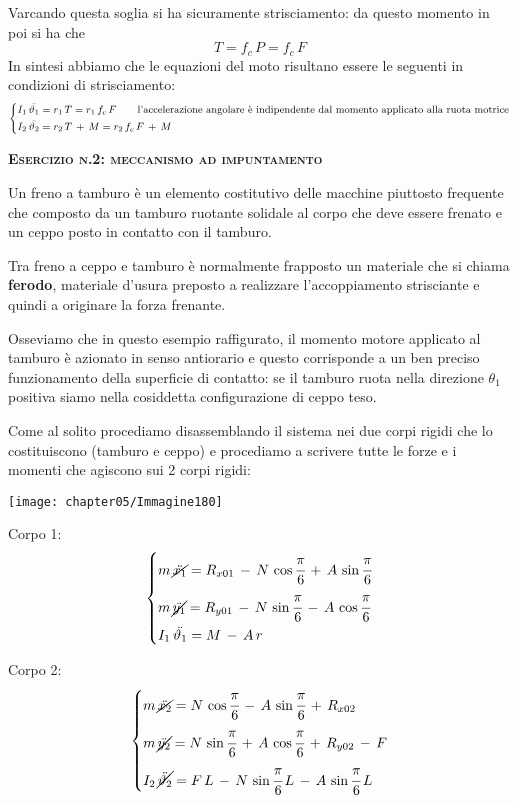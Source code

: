 Varcando questa soglia si ha sicuramente strisciamento: da questo momento in poi si ha che 
\[T=f_c\,P = f_c\,F\]
In sintesi abbiamo che le equazioni del moto risultano essere le seguenti in condizioni di strisciamento:
\[
\begin{dcases}
I_1\,\ddot{\theta_1} = r_1\,T = r_1\,f_c\,F\qquad\text{l'accelerazione angolare è indipendente dal momento applicato alla ruota motrice}\\
I_2\,\ddot{\theta_2} = r_2\,T\,+\,M = r_2\,f_c\,F\,+\,M
\end{dcases}
\]

\begin{center}
{\scshape{\bfseries Esercizio n.2: meccanismo ad impuntamento}}
\end{center}

Un freno a tamburo è un elemento costitutivo delle macchine piuttosto frequente che composto da un tamburo ruotante solidale al corpo che deve essere frenato e un ceppo posto in contatto con il tamburo.

Tra freno a ceppo e tamburo è normalmente frapposto un materiale che si chiama \textbf{ferodo}, materiale d'usura preposto a realizzare l'accoppiamento strisciante e quindi a originare la forza frenante.

Osseviamo che in questo esempio raffigurato, il momento motore applicato al tamburo è azionato in senso antiorario e questo corrisponde a un ben preciso funzionamento della superficie di contatto: se il tamburo ruota nella direzione $\theta_1$ positiva siamo nella cosiddetta configurazione di ceppo teso.

Come al solito procediamo disassemblando il sistema nei due corpi rigidi che lo costituiscono (tamburo e ceppo) e procediamo a scrivere tutte le forze e i momenti che agiscono sui 2 corpi rigidi:
\begin{center}
\texttt{[image: chapter05/Immagine180]}
\end{center}

\begin{minipage}{.5\textwidth}
Corpo 1:
\[
\begin{dcases}
m\,\cancel{\ddot{x_1}} = R_{x01}\,-\,N\,\cos{\cfrac{\pi}{6}}\,+\,A\,\sin{\cfrac{\pi}{6}}\\
m\,\cancel{\ddot{y_1}} = R_{y01}\,-\,N\,\sin{\cfrac{\pi}{6}}\,-\,A\,\cos{\cfrac{\pi}{6}}\\
I_1\,\ddot{\theta_1} = M\,-\,A\,r
\end{dcases}
\]
\end{minipage}
\hfill
\begin{minipage}{.5\textwidth}
Corpo 2:
\[
\begin{dcases}
m\,\cancel{\ddot{x_2}} = N\,\cos{\cfrac{\pi}{6}}\,-\,A\,\sin{\cfrac{\pi}{6}}\,+\,R_{x02}\\
m\,\cancel{\ddot{y_2}} = N\,\sin{\cfrac{\pi}{6}}\,+\,A\,\cos{\cfrac{\pi}{6}}\,+\,R_{y02}\,-\,F\\
I_2\,\cancel{\ddot{\theta_2}} = F\,L\,-\,N\,\sin{\cfrac{\pi}{6}}\,L\,-\,A\,\sin{\cfrac{\pi}{6}}\,L
\end{dcases}
\]
\end{minipage}

